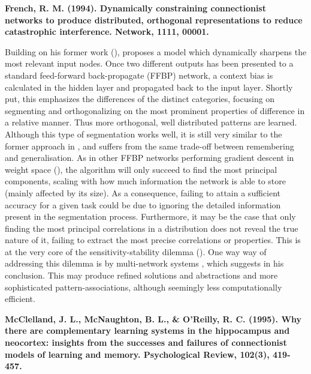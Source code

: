 \textbf{French, R. M. (1994). Dynamically constraining connectionist networks to produce distributed, orthogonal representations to reduce catastrophic interference. Network, 1111, 00001.}

Building on his former work (\cite{French1992}), \cite{French1994} proposes a model which dynamically sharpens the most relevant input nodes. Once two different outputs has been presented to a standard feed-forward back-propagate (FFBP) network, a context bias is calculated in the hidden layer and propagated back to the input layer. Shortly put, this emphasizes the differences of the distinct categories, focusing on segmenting and orthogonalizing on the most prominent properties of difference in a relative manner. Thus more orthogonal, well distributed patterns are learned.
Although this type of segmentation works well, it is still very similar to the former approach in \cite{French1992}, and suffers from the same trade-off between remembering and generalisation. As in other FFBP networks performing gradient descent in weight space (\cite{Hinton1989}), the algorithm will only succeed to find the most principal components, scaling with how much information the network is able to store (mainly affected by its size). As a consequence, failing to attain a sufficient accuracy for a given task could be due to ignoring the detailed information present in the segmentation process. Furthermore, it may be the case that only finding the most principal correlations in a distribution does not reveal the true nature of it, failing to extract the most precise correlations or properties. This is at the very core of the sensitivity-stability dilemma (\cite{Hebb1949}). One way way of addressing this dilemma is by multi-network systems , which \cite{French1994} suggests in his conclusion. This may produce refined solutions and abstractions and more sophisticated pattern-associations, although seemingly less computationally efficient.


\textbf{McClelland, J. L., McNaughton, B. L., \& O’Reilly, R. C. (1995). Why there are complementary learning systems in the hippocampus and neocortex: insights from the successes and failures of connectionist models of learning and memory. Psychological Review, 102(3), 419-457.}

